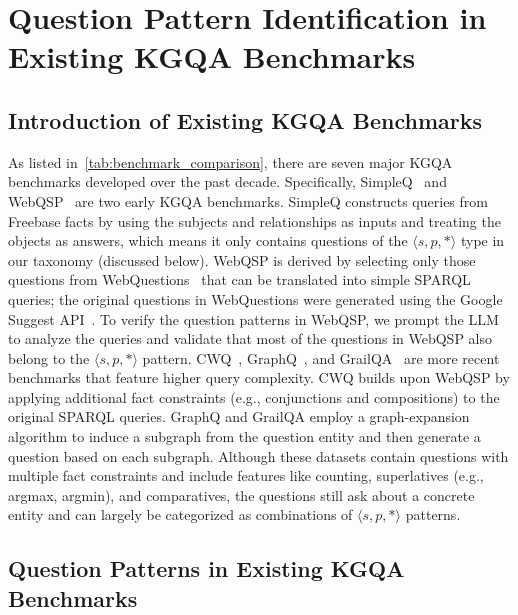 \section{Question Pattern Identification in Existing KGQA Benchmarks}\label{sec:kbqa_benchmark_appendix}

\subsection{Introduction of Existing KGQA Benchmarks}

As listed in~\autoref{tab:benchmark_comparison}, there are seven major KGQA benchmarks developed over the past decade. Specifically, SimpleQ~\cite{simpleq} and WebQSP~\cite{webqsp} are two early KGQA benchmarks. SimpleQ constructs queries from Freebase facts by using the subjects and relationships as inputs and treating the objects as answers, which means it only contains questions of the $\langle s,p,* \rangle$ type in our taxonomy (discussed below). WebQSP is derived by selecting only those questions from WebQuestions~\cite{webquestion} that can be translated into simple SPARQL queries; the original questions in WebQuestions were generated using the Google Suggest API~\cite{googlesuggestapi}. To verify the question patterns in WebQSP, we prompt the LLM to analyze the queries and validate that most of the questions in WebQSP also belong to the $\langle s,p,* \rangle$ pattern. CWQ~\cite{cwq}, GraphQ~\cite{graphq}, and GrailQA~\cite{grailqa} are more recent benchmarks that feature higher query complexity. CWQ builds upon WebQSP by applying additional fact constraints (e.g., conjunctions and compositions) to the original SPARQL queries. GraphQ and GrailQA employ a graph-expansion algorithm to induce a subgraph from the question entity and then generate a question based on each subgraph. Although these datasets contain questions with multiple fact constraints and include features like counting, superlatives (e.g., argmax, argmin), and comparatives, the questions still ask about a concrete entity and can largely be categorized as combinations of $\langle s,p,* \rangle$ patterns.

\subsection{Question Patterns in Existing KGQA Benchmarks}

